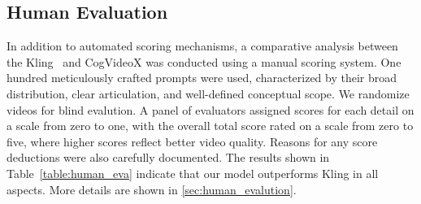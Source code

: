 





\subsection{Human Evaluation}
In addition to automated scoring mechanisms, a comparative analysis between the Kling~\citep{kling} and CogVideoX was conducted using a manual scoring system. One hundred meticulously crafted prompts were used, characterized by their broad distribution, clear articulation, and well-defined conceptual scope. We randomize videos for blind evalution. A panel of evaluators assigned scores for each detail on a scale from zero to one, with the overall total score rated on a scale from zero to five, where higher scores reflect better video quality. Reasons for any score deductions were also carefully documented. The results shown in Table~\ref{table:human_eva} indicate that our model outperforms Kling in all aspects. More details are shown in \ref{sec:human_evalution}.








